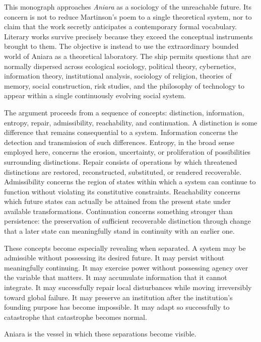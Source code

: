 \documentclass[11pt,oneside]{book}
\theoremstyle{definition}
\theoremstyle{remark}
\begin{document}
This monograph approaches \emph{Aniara} as a sociology of the unreachable future. Its concern is not to reduce Martinson's poem to a single theoretical system, nor to claim that the work secretly anticipates a contemporary formal vocabulary. Literary works survive precisely because they exceed the conceptual instruments brought to them. The objective is instead to use the extraordinary bounded world of Aniara as a theoretical laboratory. The ship permits questions that are normally dispersed across ecological sociology, political theory, cybernetics, information theory, institutional analysis, sociology of religion, theories of memory, social construction, risk studies, and the philosophy of technology to appear within a single continuously evolving social system.

The argument proceeds from a sequence of concepts: distinction, information, entropy, repair, admissibility, reachability, and continuation. A distinction is some difference that remains consequential to a system. Information concerns the detection and transmission of such differences. Entropy, in the broad sense employed here, concerns the erosion, uncertainty, or proliferation of possibilities surrounding distinctions. Repair consists of operations by which threatened distinctions are restored, reconstructed, substituted, or rendered recoverable. Admissibility concerns the region of states within which a system can continue to function without violating its constitutive constraints. Reachability concerns which future states can actually be attained from the present state under available transformations. Continuation concerns something stronger than persistence: the preservation of sufficient recoverable distinction through change that a later state can meaningfully stand in continuity with an earlier one.

These concepts become especially revealing when separated. A system may be admissible without possessing its desired future. It may persist without meaningfully continuing. It may exercise power without possessing agency over the variable that matters. It may accumulate information that it cannot integrate. It may successfully repair local disturbances while moving irreversibly toward global failure. It may preserve an institution after the institution's founding purpose has become impossible. It may adapt so successfully to catastrophe that catastrophe becomes normal.

Aniara is the vessel in which these separations become visible.
\end{document}

